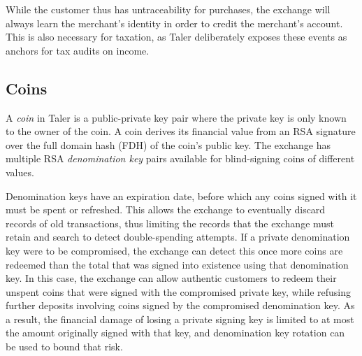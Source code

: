 \documentclass[sigconf, authordraft]{acmart}
\begin{document}
While the customer thus has untraceability for purchases, the exchange will
always learn the merchant's identity in order to credit the merchant's
account.  This is also necessary for taxation, as Taler deliberately
exposes these events as anchors for tax audits on income.




\subsection{Coins}

A \emph{coin} in Taler is a public-private key pair where the private
key is only known to the owner of the coin.  A coin derives its
financial value from an RSA signature over the full domain hash (FDH)
of the coin's public key. The exchange has multiple RSA
{\em denomination key} pairs available for blind-signing coins of
different values.

Denomination keys have an expiration date, before which any coins
signed with it must be spent or refreshed.  This allows the exchange
to eventually discard records of old transactions, thus limiting the
records that the exchange must retain and search to detect
double-spending attempts.  If a private denomination key were to be
compromised, the exchange can detect this once more coins are redeemed
than the total that was signed into existence using that denomination
key.  In this case, the exchange can allow authentic customers to
redeem their unspent coins that were signed with the compromised
private key, while refusing further deposits involving coins signed by
the compromised denomination key.  As a result, the financial damage
of losing a private signing key is limited to at most the amount
originally signed with that key, and denomination key rotation can be
used to bound that risk.
\end{document}
